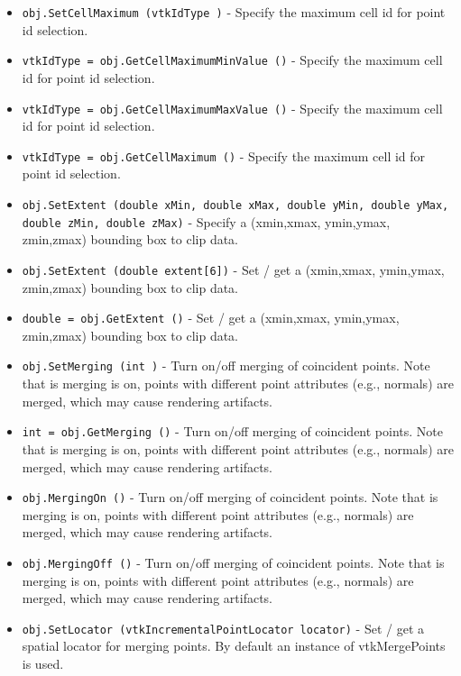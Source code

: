 \begin{itemize}
\item  \verb|obj.SetCellMaximum (vtkIdType )| -  Specify the maximum cell id for point id selection.

\item  \verb|vtkIdType = obj.GetCellMaximumMinValue ()| -  Specify the maximum cell id for point id selection.

\item  \verb|vtkIdType = obj.GetCellMaximumMaxValue ()| -  Specify the maximum cell id for point id selection.

\item  \verb|vtkIdType = obj.GetCellMaximum ()| -  Specify the maximum cell id for point id selection.

\item  \verb|obj.SetExtent (double xMin, double xMax, double yMin, double yMax, double zMin, double zMax)| -  Specify a (xmin,xmax, ymin,ymax, zmin,zmax) bounding box to clip data.

\item  \verb|obj.SetExtent (double extent[6])| -  Set / get a (xmin,xmax, ymin,ymax, zmin,zmax) bounding box to clip data.

\item  \verb|double = obj.GetExtent ()| -  Set / get a (xmin,xmax, ymin,ymax, zmin,zmax) bounding box to clip data.

\item  \verb|obj.SetMerging (int )| -  Turn on/off merging of coincident points. Note that is merging is
 on, points with different point attributes (e.g., normals) are merged,
 which may cause rendering artifacts.

\item  \verb|int = obj.GetMerging ()| -  Turn on/off merging of coincident points. Note that is merging is
 on, points with different point attributes (e.g., normals) are merged,
 which may cause rendering artifacts.

\item  \verb|obj.MergingOn ()| -  Turn on/off merging of coincident points. Note that is merging is
 on, points with different point attributes (e.g., normals) are merged,
 which may cause rendering artifacts.

\item  \verb|obj.MergingOff ()| -  Turn on/off merging of coincident points. Note that is merging is
 on, points with different point attributes (e.g., normals) are merged,
 which may cause rendering artifacts.

\item  \verb|obj.SetLocator (vtkIncrementalPointLocator locator)| -  Set / get a spatial locator for merging points. By
 default an instance of vtkMergePoints is used.


\end{itemize}
